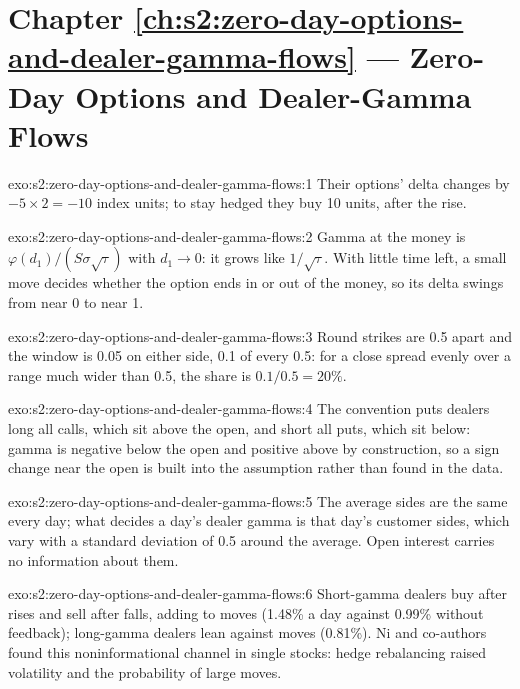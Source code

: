 \section*{Chapter \ref{ch:s2:zero-day-options-and-dealer-gamma-flows} --- Zero-Day Options and Dealer-Gamma Flows}

\begin{solution}{exo:s2:zero-day-options-and-dealer-gamma-flows:1}
Their options' delta changes by $-5 \times 2 = -10$ index units; to stay hedged they buy 10 units, after the rise.
\end{solution}

\begin{solution}{exo:s2:zero-day-options-and-dealer-gamma-flows:2}
Gamma at the money is $\varphi(d_1)/(S\sigma\sqrt\tau)$ with $d_1 \to 0$: it grows like $1/\sqrt\tau$. With little time left, a small move decides
whether the option ends in or out of the money, so its delta swings from near 0 to near 1.
\end{solution}

\begin{solution}{exo:s2:zero-day-options-and-dealer-gamma-flows:3}
Round strikes are 0.5 apart and the window is 0.05 on either side, 0.1 of every 0.5: for a close spread evenly over a range much wider than 0.5, the
share is $0.1/0.5 = 20\%$.
\end{solution}

\begin{solution}{exo:s2:zero-day-options-and-dealer-gamma-flows:4}
The convention puts dealers long all calls, which sit above the open, and short all puts, which sit below: gamma is negative below the open and
positive above by construction, so a sign change near the open is built into the assumption rather than found in the data.
\end{solution}

\begin{solution}{exo:s2:zero-day-options-and-dealer-gamma-flows:5}
The average sides are the same every day; what decides a day's dealer gamma is that day's customer sides, which vary with a standard deviation of
0.5 around the average. Open interest carries no information about them.
\end{solution}

\begin{solution}{exo:s2:zero-day-options-and-dealer-gamma-flows:6}
Short-gamma dealers buy after rises and sell after falls, adding to moves (1.48\% a day against 0.99\% without feedback); long-gamma dealers lean
against moves (0.81\%). Ni and co-authors found this noninformational channel in single stocks: hedge rebalancing raised volatility and the
probability of large moves.
\end{solution}

